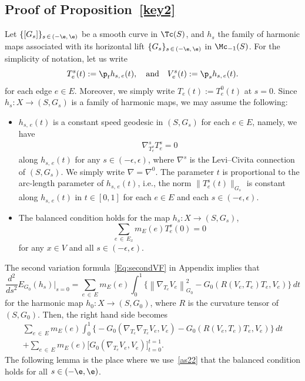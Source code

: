\subsection{Proof of Proposition~\ref{key2}} Let $\{[G_s]\}_{s\,\in\,(-\e,\,\e)}$ be a smooth curve in $\Tc(S)$, and $h_{s}$ the family of harmonic maps associated with its horizontal lift $\{G_s\}_{s\,\in\,(-\e,\,\e)}$ in $\Mc_{-1}(S)$. For the simplicity of notation, let us write
\[
T_e^{s}(t):=\p_t h_{s,\,e}(t), \quad \text{and} \quad V_e^{s}(t):=\p_s h_{s,\,e}(t).
\]
for each edge $e\in E$. Moreover, we simply write $T_e(t):=T_e^{0}(t)$ at $s=0$. Since $h_{s}: X\to (S, G_{s})$ is a family of harmonic maps, we may assume the following:
\begin{itemize}
\item $h_{s,\,e}(t)$ is a constant speed geodesic in $(S, G_{s})$ for each $e\in E$, namely, we have
\begin{align}\label{as21}
\nabla^{s}_{T_e^{s}}T_e^{s}=0
\end{align}
along $h_{s,\,e}(t)$ for any $s \in (-\epsilon, \epsilon)$, where $\nabla^{s}$ is the Levi--Civita connection of $(S, G_{s})$. We simply write $\nabla=\nabla^0$. The parameter $t$ is proportional to the arc-length parameter of $h_{s,\,e}(t)$, i.e., the norm $\|T_e^{s}(t)\|_{G_{s}}$ is constant along $h_{s,\,e}(t)$ in $t \in [0, 1]$ for each $e\in E$ and each $s \in (-\epsilon, \epsilon)$.
\item The balanced condition holds for the map $h_{s}: X\to (S, G_{s})$,
\begin{equation}\label{as22}
\sum_{e\,\in\,E_x}m_E(e) T_e^{s}(0)=0
\end{equation}
for any $x\in V$ and all $s\in (-\epsilon, \epsilon)$.
\end{itemize}



The second variation formula~\eqref{Eq:secondVF} in Appendix implies that
\begin{equation}\label{hf1}
\frac{d^2}{d s^2} E_{G_0}(h_{s})\Big|_{s=0}=\sum_{e\,\in\,E}m_E(e) \int_0^1 \Big\{\left\|\nabla_{T_e}V_e\right\|_{G_0}^2 -G_0\left(R\left(V_e, T_e\right)T_e, V_e\right)\Big\}\,dt
\end{equation}
for the harmonic map $h_{0}: X\to (S,G_0)$, where $R$ is the curvature tensor of $(S, G_0)$. Then, the right hand side becomes
\begin{multline}\label{hf2}
\sum_{e\,\in\,E}m_E(e)\int_0^1\Big\{-G_0\left(\nabla_{T_e}\nabla_{T_e}V_e, V_e\right)-G_0\left(R\left(V_e, T_e\right)T_e, V_e\right)\Big\}\,dt\\
+\sum_{e\,\in\,E}m_E(e)\big[G_0\left(\nabla_{T_e}V_e, V_e\right)\big]_{t=0}^{t=1}.
\end{multline}
The following lemma is the place where we use~\eqref{as22} that the balanced condition holds for all $s \in (-\e, \e)$.


